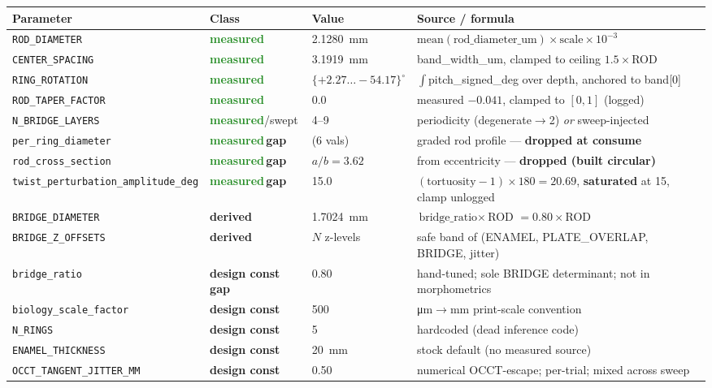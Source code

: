 \documentclass[11pt]{article}
\newcommand{\param}[1]{\texttt{#1}}
\newcommand{\sMeas}{\textcolor{ForestGreen}{\textbf{measured}}}
\newcommand{\sDeriv}{\textcolor{NavyBlue}{\textbf{derived}}}
\newcommand{\sConst}{\textcolor{RawSienna}{\textbf{design const}}}
\newcommand{\sGap}{\textcolor{BrickRed}{\textbf{gap}}}
\begin{document}
\renewcommand{\arraystretch}{1.25}
\begin{longtable}{@{}p{} p{} p{} p{}@{}}
\toprule
\textbf{Parameter} & \textbf{Class} & \textbf{Value} & \textbf{Source / formula} \\
\midrule
\endhead
\param{ROD\_DIAMETER}   & \sMeas  & \SI{2.1280}{mm} & $\mathrm{mean}(\text{rod\_diameter\_um})\times \text{scale}\times 10^{-3}$ \\
\param{CENTER\_SPACING} & \sMeas  & \SI{3.1919}{mm} & band\_width\_um, clamped to ceiling $1.5\times$ROD \\
\param{RING\_ROTATION}  & \sMeas  & $\{+2.27\ldots-54.17\}^\circ$ & $\int$pitch\_signed\_deg over depth, anchored to band[0] \\
\param{ROD\_TAPER\_FACTOR} & \sMeas & 0.0 & measured $-0.041$, clamped to $[0,1]$ (logged) \\
\param{N\_BRIDGE\_LAYERS} & \sMeas/swept & 4--9 & periodicity (degenerate$\to$2) \emph{or} sweep-injected \\
\param{per\_ring\_diameter} & \sMeas\,\sGap & (6 vals) & graded rod profile --- \textbf{dropped at consume} \\
\param{rod\_cross\_section} & \sMeas\,\sGap & $a/b=3.62$ & from eccentricity --- \textbf{dropped (built circular)} \\
\param{twist\_perturbation\_amplitude\_deg} & \sMeas\,\sGap & 15.0 & $(\text{tortuosity}-1)\times180=20.69$, \textbf{saturated} at 15, clamp unlogged \\
\midrule
\param{BRIDGE\_DIAMETER} & \sDeriv & \SI{1.7024}{mm} & $\text{bridge\_ratio}\times$ROD $=0.80\times$ROD \\
\param{BRIDGE\_Z\_OFFSETS} & \sDeriv & $N$ z-levels & safe band of (ENAMEL, PLATE\_OVERLAP, BRIDGE, jitter) \\
\midrule
\param{bridge\_ratio}    & \sConst\,\sGap & 0.80 & hand-tuned; sole BRIDGE determinant; not in morphometrics \\
\param{biology\_scale\_factor} & \sConst & 500 & \si{\micro\meter}$\to$mm print-scale convention \\
\param{N\_RINGS}         & \sConst & 5 & hardcoded (dead inference code) \\
\param{ENAMEL\_THICKNESS} & \sConst & \SI{20}{mm} & stock default (no measured source) \\
\param{OCCT\_TANGENT\_JITTER\_MM} & \sConst & 0.50 & numerical OCCT-escape; per-trial; mixed across sweep \\

\end{longtable}
\end{document}
